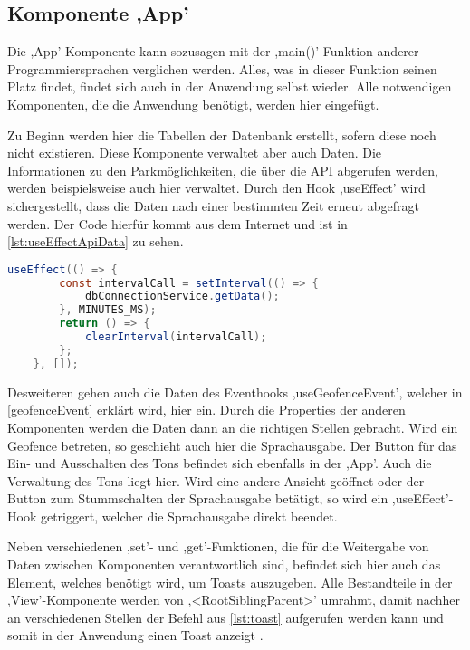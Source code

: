 \subsection{Komponente ,App'}
Die ,App'-Komponente kann sozusagen mit der ,main()'-Funktion anderer Programmiersprachen verglichen werden. Alles, was in dieser Funktion seinen Platz findet, findet sich auch in der Anwendung selbst wieder. Alle notwendigen Komponenten, die die Anwendung benötigt, werden hier eingefügt. 

Zu Beginn werden hier die Tabellen der Datenbank erstellt, sofern diese noch nicht existieren. Diese Komponente verwaltet aber auch Daten. Die Informationen zu den Parkmöglichkeiten, die über die API abgerufen werden, werden beispielsweise auch hier verwaltet. Durch den Hook ,useEffect' wird sichergestellt, dass die Daten nach einer bestimmten Zeit erneut abgefragt werden. Der Code hierfür kommt aus dem Internet und ist in \autoref{lst:useEffectApiData} zu sehen.

\begin{lstlisting}[caption={In diesem ,useEffect'-Hook werden nach der Zeit, welche sich hinter der Variable ,MINUTES\_MS' verbirgt, die Daten der API abgerufen, was über die Funktion in Zeile 3 geschieht. (Quelle: \cite{useIntervalCode})},captionpos=b, language=Java, label=lst:useEffectApiData]
	useEffect(() => {
		const intervalCall = setInterval(() => {
			dbConnectionService.getData();
		}, MINUTES_MS);
		return () => {
			clearInterval(intervalCall);
		};
	}, []);
\end{lstlisting}

Desweiteren gehen auch die Daten des Eventhooks ,useGeofenceEvent', welcher in \autoref{geofenceEvent} erklärt wird, hier ein. Durch die Properties der anderen Komponenten werden die Daten dann an die richtigen Stellen gebracht. Wird ein Geofence betreten, so geschieht auch hier die Sprachausgabe. Der Button für das Ein- und Ausschalten des Tons befindet sich ebenfalls in der ,App'. Auch die Verwaltung des Tons liegt hier. Wird eine andere Ansicht geöffnet oder der Button zum Stummschalten der Sprachausgabe betätigt, so wird ein ,useEffect'-Hook getriggert, welcher die Sprachausgabe direkt beendet.

Neben verschiedenen ,set'- und ,get'-Funktionen, die für die Weitergabe von Daten zwischen Komponenten verantwortlich sind, befindet sich hier auch das Element, welches benötigt wird, um Toasts auszugeben. Alle Bestandteile in der ,View'-Komponente werden von ,<RootSiblingParent>' umrahmt, damit nachher an verschiedenen Stellen der Befehl aus \autoref{lst:toast} aufgerufen werden kann und somit in der Anwendung einen Toast anzeigt \cite{toastLibrary}.


